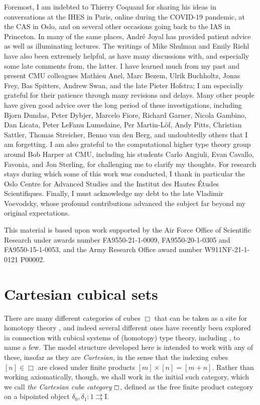 \documentclass[11pt,reqno]{amsart}
\newcommand{\C}{\ensuremath{\boxempty}}
\newcommand{\I}{\ensuremath{\mathrm{I}}}
\theoremstyle{remark}
\theoremstyle{definition}
\begin{document}
Foremost, I am indebted to Thierry Coquand for sharing his ideas in conversations at the IHES in Paris, online during the COVID-19 pandemic, at the CAS in Oslo, and on several other occasions going back to the IAS in Princeton.  In many of the same places, Andr\'e Joyal has provided patient advice as well as illuminating lectures.   The writings of Mike Shulman and Emily Riehl have also been extremely helpful, as have many discussions with, and especially some late comments from, the latter.  I have learned much from my past and present CMU colleagues Mathieu Anel, Marc Bezem, Ulrik Buchholtz, Jonas Frey, Bas Spitters, Andrew Swan, and the late Pieter Hofstra; I am especially grateful for their patience through many revisions and delays.  Many other people have given good advice over the long period of these investigations, including Bjorn Dundas, Peter Dybjer, Marcelo Fiore, Richard Garner, Nicola Gambino, Dan Licata, Peter LeFanu Lumsdaine, Per Martin-L\"of, Andy Pitts, Christian Sattler, Thomas Streicher, Benno van den Berg, and undoubtedly others that I am forgetting.
I am also grateful to the computational higher type theory group around Bob Harper at CMU, including his students Carlo Angiuli, Evan Cavallo, Favonia, and Jon Sterling, for challenging me to clarify my thoughts.  
For research stays during which some of this work was conducted, I thank in particular the Oslo Centre for Advanced Studies and the Institut des Hautes \'Etudes Scientifiques.   Finally, I must acknowledge my debt to the late Vladimir Voevodsky, whose profound contributions advanced the subject far beyond my original expectations.

This material is based upon work supported by the Air Force Office of Scientific Research under awards number FA9550-21-1-0009, FA9550-20-1-0305 and FA9550-15-1-0053, and the Army Research Office award number W911NF-21-1-0121 P00002.



\clearpage
\section{Cartesian cubical sets}\label{sec:cSet}

There are many different categories of cubes $\Box$ that can be taken as a site for homotopy theory \cite{Grandis:2003,BuchholtzMoorehouse}, and indeed several different ones have recently been explored in connection with cubical systems of (homotopy) type theory, including \cite{BCH,orton-pitts, CCHM:2018ctt,ABCHFL,CMS:2020}, to name a few.  The model structure developed here is intended to work with any of these, insofar as they are  \emph{Cartesian}, in the sense that the indexing cubes $[n]\in\Box$ are closed under finite products $[m]\times[n] = [m+n]$.   Rather than working axiomatically, though, we shall work in the initial such category, which we call \emph{the Cartesian cube category} $\C$, defined as the free finite product category on a bipointed object $\delta_0, \delta_1 : 1\rightrightarrows \I$.
\end{document}
